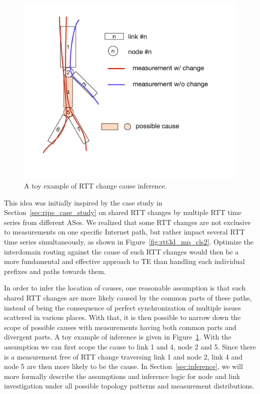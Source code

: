 \begin{figure}[!htb]
\centering
\includegraphics[width=.75\textwidth]{gfx/chap5/toy_inference.pdf}
\caption{A toy example of RTT change cause inference.}
\label{fig:chap5_toy_inference}
\end{figure}

This idea was initially inspired by the case study in Section~\ref{sec:ripe_case_study} on shared RTT changes by multiple RTT time series from different ASes. 
We realized that some RTT changes are not exclusive to measurements on one specific Internet path, but rather impact several RTT time series simultaneously, as shown in Figure~\ref{fig:rtt3d_mp_cls2}.
Optimize the interdomain routing against the cause of such RTT changes would then be a more fundamental and effective approach to TE than handling each individual prefixes and paths towards them.

In order to infer the location of causes, one reasonable assumption is that such shared RTT changes are more likely caused by the common parts of these paths, instead of being the consequence of perfect synchronization of multiple issues scattered in various places.
With that, it is then possible to narrow down the scope of possible causes with measurements having both common parts and divergent parts. 
A toy example of inference is given in Figure~\ref{fig:chap5_toy_inference}. 
With the assumption we can first scope the cause to link 1 and 4, node 2 and 5. 
Since there is a measurement free of RTT change traversing link 1 and node 2, link 4 and node 5 are then more likely to be the cause. 
In Section~\ref{sec:inference}, we will more formally describe the assumptions and inference logic for node and link investigation under all possible topology patterns and measurement distributions.

